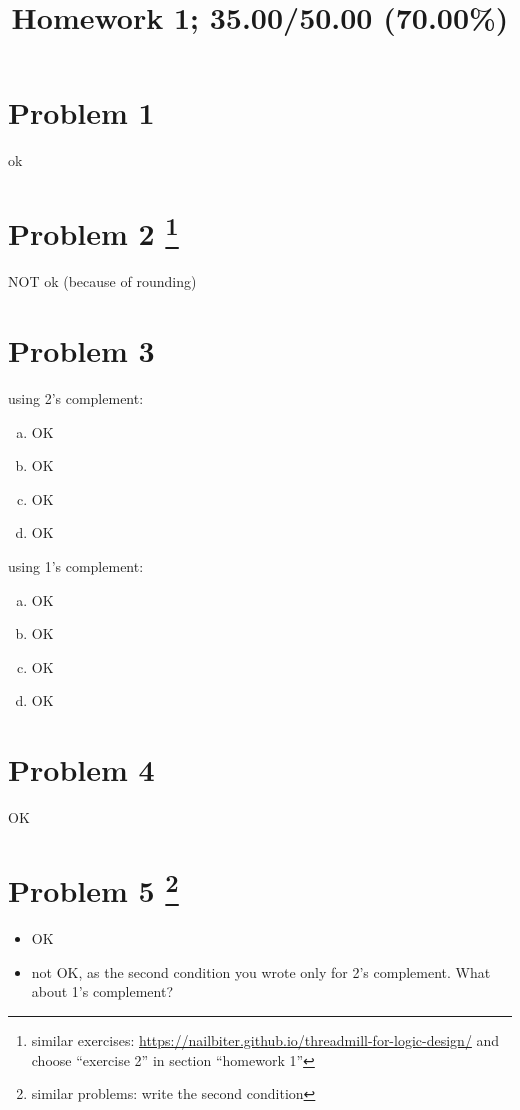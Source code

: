 \documentclass[10pt]{article} %
\title{Homework 1;
 35.00/50.00 (70.00\%)
}
\begin{document}
\maketitle

\section*{Problem 1 }
ok
\section*{Problem 2  \footnote{similar exercises: \url{https://nailbiter.github.io/threadmill-for-logic-design/} and choose ``exercise 2'' in section ``homework 1''}}
NOT ok (because of rounding)
\section*{Problem 3 }
using 2's complement:
\begin{enumerate}[(a)]
  \item OK
  \item OK
  \item OK
  \item OK
\end{enumerate}
using 1's complement:
\begin{enumerate}[(a)]
  \item OK
  \item OK
  \item OK
  \item OK
\end{enumerate}
\section*{Problem 4 }
OK
\section*{Problem 5  \footnote{similar problems: write the second condition}}
\begin{itemize}
  \item OK
  \item 
    not OK, as the second condition you wrote only for 2's complement. What about 1's complement?
\end{itemize}
\end{document}
